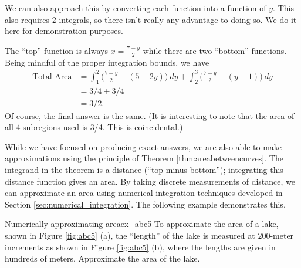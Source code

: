 \begin{solution}
{We can also approach this by converting each function into a function of $y$. This also requires $ 2 $ integrals, so there isn't really any advantage to doing so. We do it here for demonstration purposes.

The ``top'' function is always $x=\frac{7-y}2$ while there are two ``bottom'' functions. Being mindful of the proper integration bounds, we have
\begin{align*}
\text{Total Area} &= \int_1^2\big(\frac{7-y}2 - (5-2y)\big)\ dy + \int_2^3\big(\frac{7-y}2-(y-1)\big)\ dy \\
			&= 3/4 + 3/4\\
			&= 3/2.
\end{align*}
Of course, the final answer is the same. (It is interesting to note that the area of all 4 subregions used is 3/4. This is coincidental.)
}
\end{solution}


%
While we have focused on producing exact answers, we are also able to make approximations using the principle of Theorem \ref{thm:areabetweencurves}. The integrand in the theorem is a distance (``top minus bottom''); integrating this distance function gives an area. By taking discrete measurements of distance, we can approximate an area using numerical integration techniques developed in Section \ref{sec:numerical_integration}. The following example demonstrates this.\\

\begin{example}{Numerically approximating area}{ex_abc5}{
To approximate the area of a lake, shown in Figure \ref{fig:abc5} (a),  the ``length'' of the lake is measured at $ 200 $-meter increments as shown in Figure \ref{fig:abc5} (b), where the lengths are given in hundreds of meters. Approximate the area of the lake.}
\end{example}


